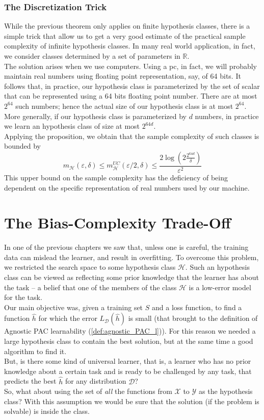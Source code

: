 \documentclass[12pt]{report}
\theoremstyle{plain}
\newcommand\mcl[1]{\mathcal{#1}}
\begin{document}
\begin{flushleft}
\subsection{The Discretization Trick}
While the previous theorem only applies on finite hypothesis classes, there is a simple trick that allow us to get a very good estimate of the practical sample complexity of infinite hypothesis classes. In many real world application, in fact, we consider classes determined by a set of parameters in $\mathds{R}$.\\
The solution arises when we use computers. Using a pc, in fact, we will probably maintain real numbers using floating point representation, say, of 64 bits. It follows that, in practice, our hypothesis class is parameterized by the set of scalar that can be represented using a 64 bits floating point number. There are at most $2^{64}$ such numbers; hence the actual size of our hypothesis class is at most $2^{64}$. More generally, if our hypothesis class is parameterized by $d$ numbers, in practice we learn an hypothesis class of size at most $2^{64d}$.\\
Applying the proposition, we obtain that the sample complexity of such classes is bounded by
\[ m_\mcl{H}(\varepsilon,\delta)\leq m_\mcl{H}^{UC}(\varepsilon/2,\delta)\leq \frac{2\log\left(2\frac{2^{64d}}{\delta}\right)}{\varepsilon^2} \] 
This upper bound on the sample complexity has the deficiency of being dependent on the specific representation of real numbers used by our machine.


\chapter{The Bias-Complexity Trade-Off}
In one of the previous chapters we saw that, unless one is careful, the training data can mislead the learner, and result in overfitting. To overcome this problem, we restricted the search space to some hypothesis class $\mcl{H}$. Such an hypothesis class can be viewed as reflecting some prior knowledge that the learner has about the task – a belief that one of the members of the class $\mcl{H}$ is a low-error model for the task.\\
Our main objective was, given a training set $S$ and a loss function, to find a function $\hat{h}$ for which the error $L_\mcl{D}(\hat{h})$ is small (that brought to the definition of Agnostic PAC learnability (\ref{def:agnostic_PAC_l})). For this reason we needed a large hypothesis class to contain the best solution, but at the same time a good algorithm to find it.\\
But, is there some kind of universal learner, that is, a learner who has no prior knowledge about a certain task and is ready to be challenged by any task, that predicts the best $\hat{h}$ for any distribution $\mcl{D}$?\\
So, what about using the set of \textit{all} the functions from $\mcl{X}$ to $\mcl{Y}$ as the hypothesis class? With this assumption we would be sure that the solution (if the problem is solvable) is inside the class.\\


\end{flushleft}
\end{document}

